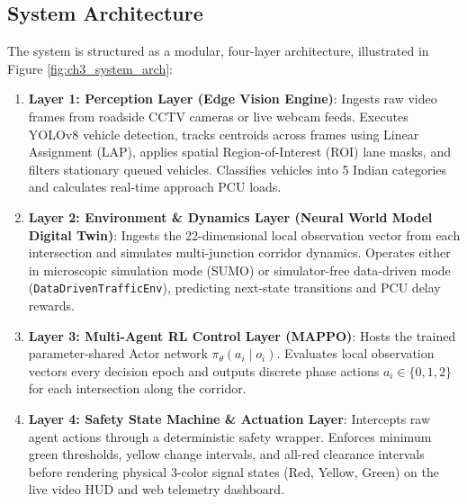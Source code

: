 \subsection{System Architecture}
The system is structured as a modular, four-layer architecture, illustrated in Figure \ref{fig:ch3_system_arch}:
\begin{enumerate}
    \item \textbf{Layer 1: Perception Layer (Edge Vision Engine)}: Ingests raw video frames from roadside CCTV cameras or live webcam feeds. Executes YOLOv8 vehicle detection, tracks centroids across frames using Linear Assignment (LAP), applies spatial Region-of-Interest (ROI) lane masks, and filters stationary queued vehicles. Classifies vehicles into 5 Indian categories and calculates real-time approach PCU loads.
    \item \textbf{Layer 2: Environment \& Dynamics Layer (Neural World Model Digital Twin)}: Ingests the 22-dimensional local observation vector from each intersection and simulates multi-junction corridor dynamics. Operates either in microscopic simulation mode (SUMO) or simulator-free data-driven mode (\texttt{DataDrivenTrafficEnv}), predicting next-state transitions and PCU delay rewards.
    \item \textbf{Layer 3: Multi-Agent RL Control Layer (MAPPO)}: Hosts the trained parameter-shared Actor network $\pi_\theta(a_i \mid o_i)$. Evaluates local observation vectors every decision epoch and outputs discrete phase actions $a_i \in \{0, 1, 2\}$ for each intersection along the corridor.
    \item \textbf{Layer 4: Safety State Machine \& Actuation Layer}: Intercepts raw agent actions through a deterministic safety wrapper. Enforces minimum green thresholds, yellow change intervals, and all-red clearance intervals before rendering physical 3-color signal states (Red, Yellow, Green) on the live video HUD and web telemetry dashboard.
\end{enumerate}

